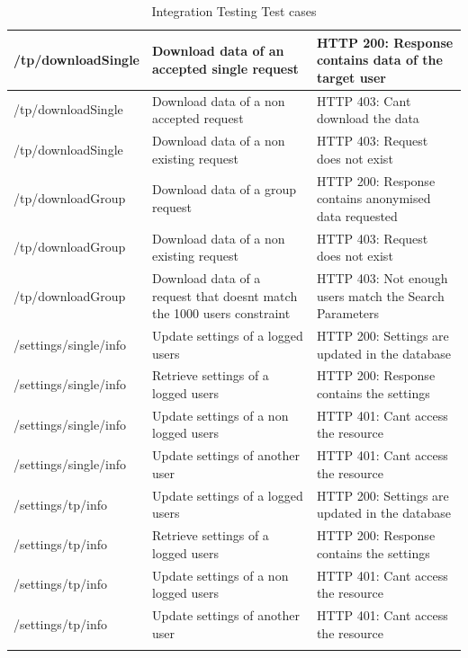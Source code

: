 \documentclass[titlepage]{article}
\begin{document}
\begin{longtable}{| p{3 cm} | p{4 cm} | p{4 cm} |}
		/tp/downloadSingle & Download data of an accepted single request & HTTP 200: Response contains data of the target user \\ \hline
		/tp/downloadSingle & Download data of a non accepted request & HTTP 403: Can\textsc{\char13}t download the data \\ \hline
		/tp/downloadSingle & Download data of a non existing request & HTTP 403: Request does not exist \\ \hline
		/tp/downloadGroup & Download data of a group request & HTTP 200: Response contains anonymised data requested \\ \hline
		/tp/downloadGroup & Download data of a non existing request & HTTP 403: Request does not exist \\ \hline
		/tp/downloadGroup & Download data of a request that doesn\textsc{\char13}t match the 1000 users constraint & HTTP 403: Not enough users match the Search Parameters \\ \hline
		/settings/single/info & Update settings of a logged users & HTTP 200: Settings are updated in the database \\ \hline
		/settings/single/info & Retrieve settings of a logged users & HTTP 200: Response contains the settings \\ \hline
		/settings/single/info & Update settings of a non logged users & HTTP 401: Can\textsc{\char13}t access the resource \\ \hline
		/settings/single/info & Update settings of another user & HTTP 401: Can\textsc{\char13}t access the resource \\ \hline
		/settings/tp/info & Update settings of a logged users & HTTP 200: Settings are updated in the database \\ \hline
		/settings/tp/info & Retrieve settings of a logged users & HTTP 200: Response contains the settings \\ \hline
		/settings/tp/info & Update settings of a non logged users & HTTP 401: Can\textsc{\char13}t access the resource \\ \hline
		/settings/tp/info & Update settings of another user & HTTP 401: Can\textsc{\char13}t access the resource \\ \hline
		\caption{Integration Testing Test cases}	
	\end{longtable}
	
\end{document}

